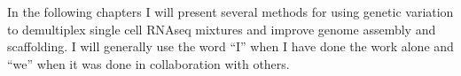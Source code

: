 \par{
In the following chapters I will present several methods for using genetic variation to demultiplex single cell RNAseq mixtures and improve genome assembly and scaffolding. I will generally use the word ``I'' when I have done the work alone and ``we'' when it was done in collaboration with others.
}

